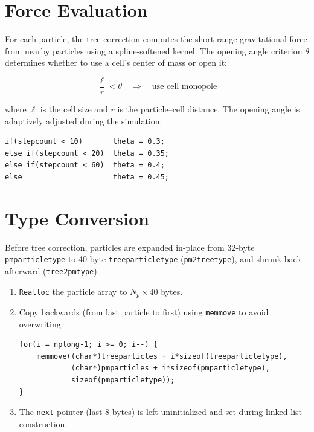 \documentclass[11pt,fleqn]{book}
\newcommand{\code}[1]{\texttt{#1}}
\begin{document}
\section{Force Evaluation}

For each particle, the tree correction computes the short-range gravitational force from nearby particles using a spline-softened kernel.  The opening angle criterion $\theta$ determines whether to use a cell's center of mass or open it:

\begin{equation}
  \frac{\ell}{r} < \theta \quad\Rightarrow\quad \text{use cell monopole}
\end{equation}

where $\ell$ is the cell size and $r$ is the particle--cell distance.  The opening angle is adaptively adjusted during the simulation:

\begin{lstlisting}[style=ccode,numbers=none]
if(stepcount < 10)       theta = 0.3;
else if(stepcount < 20)  theta = 0.35;
else if(stepcount < 60)  theta = 0.4;
else                     theta = 0.45;
\end{lstlisting}

\section{Type Conversion}

Before tree correction, particles are expanded in-place from 32-byte \code{pmparticletype} to 40-byte \code{treeparticletype} (\code{pm2treetype}), and shrunk back afterward (\code{tree2pmtype}).

\begin{algorithm}
\begin{enumerate}[leftmargin=2em]
  \item \code{Realloc} the particle array to $N_p \times 40$ bytes.
  \item Copy backwards (from last particle to first) using \code{memmove} to avoid overwriting:
\begin{lstlisting}[style=ccode,numbers=none]
for(i = nplong-1; i >= 0; i--) {
    memmove((char*)treeparticles + i*sizeof(treeparticletype),
            (char*)pmparticles + i*sizeof(pmparticletype),
            sizeof(pmparticletype));
}
\end{lstlisting}
  \item The \code{next} pointer (last 8 bytes) is left uninitialized and set during linked-list construction.
\end{enumerate}
\end{algorithm}
\end{document}
